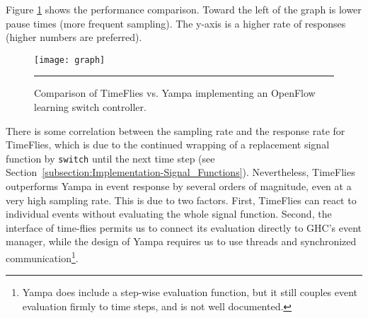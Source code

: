 Figure \ref{fig:timeflies-yampa-comparison} shows the performance comparison.
Toward the left of the graph is lower pause times (more frequent sampling). The
y-axis is a higher rate of responses (higher numbers are preferred). 

\begin{figure}
\texttt{[image: graph]}
\hrule
\caption{Comparison of TimeFlies vs. Yampa implementing an OpenFlow learning switch controller.}
\label{fig:timeflies-yampa-comparison}
\end{figure}

There is some correlation between the sampling rate and the response rate
for TimeFlies, which is due to the continued wrapping of a replacement signal
function by {\tt switch} until the next time step (see Section~\ref{subsection:Implementation-Signal_Functions}).
Nevertheless, TimeFlies outperforms Yampa in event response by several orders of magnitude,
even at a very high sampling rate. This is due to two factors. First, TimeFlies can react
to individual events without evaluating the whole signal function. Second, the
interface of time-flies permits us to connect its evaluation directly to GHC's event
manager, while the design of Yampa requires us to use threads and synchronized
communication\footnote{Yampa does include a step-wise evaluation function, but
it still couples event evaluation firmly to time steps, and is not well
documented.}.

